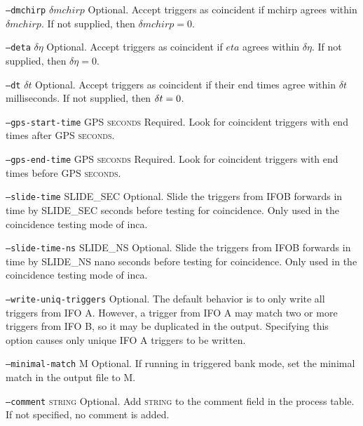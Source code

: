 \begin{entry}
\begin{entry}
\item[\texttt{--dmchirp} \textsc{$\delta mchirp$}] Optional. Accept
triggers as coincident if mchirp agrees within $\delta mchirp$.  If not
supplied,  then $\delta mchirp = 0$.

\item[\texttt{--deta} \textsc{$\delta \eta$}] Optional. Accept triggers
as coincident if $eta$ agrees within $\delta \eta$.  If not supplied,
then $\delta \eta = 0$.

\item[\texttt{--dt} \textsc{$\delta t$}] Optional. Accept triggers as
coincident if their end times agree within $\delta t$ milliseconds.  If
not supplied,  then $\textsc{$\delta t$} = 0$.

\item[\texttt{--gps-start-time} \textsc{GPS seconds}] Required.  Look
for coincident triggers with end times after \textsc{GPS seconds}.

\item[\texttt{--gps-end-time} \textsc{GPS seconds}] Required.  Look for
coincident triggers with end times before \textsc{GPS seconds}.

\item[\texttt{--slide-time}] \textsc{SLIDE\_SEC} Optional.  Slide the
triggers from \textsc{IFOB} forwards in time by  \textsc{SLIDE\_SEC}
seconds before testing for coincidence.  Only used in the coincidence
testing mode of inca.

\item[\texttt{--slide-time-ns}] \textsc{SLIDE\_NS} Optional.  Slide the
triggers from \textsc{IFOB} forwards in time by  \textsc{SLIDE\_NS} nano
seconds before testing for coincidence.  Only used in the coincidence
testing mode of inca.

\item[\texttt{--write-uniq-triggers}] Optional.  The default behavior is
to only write all triggers from IFO A. However, a trigger from IFO A may
match two or more triggers from IFO B, so it may be duplicated in the
output. Specifying this option causes only unique IFO A triggers to be
written.

\item[\texttt{--minimal-match} \textsc{M}] Optional.  If running in triggered
bank mode, set the minimal match in the output file to \textsc{M}.

\item[\texttt{--comment} \textsc{string}] Optional. Add \textsc{string}
to the comment field in the process table. If not specified, no comment
is added. 


\end{entry}
\end{entry}
